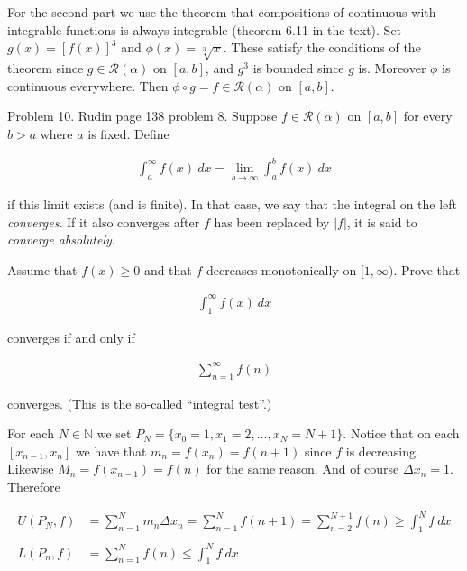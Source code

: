 \documentclass{article}
\begin{document}
  For the second part we use the theorem that compositions of continuous with integrable functions is always integrable (theorem 6.11 in the text).  Set $g(x)=[f(x)]^3$ and $\phi(x)=\sqrt[3]x$.  These satisfy the conditions of the theorem since $g\in\mathscr R(\alpha)$ on $[a,b]$, and $g^3$ is bounded since $g$ is.  Moreover $\phi$ is continuous everywhere. Then $\phi\circ g = f \in\mathscr R(\alpha)$ on $[a,b]$.

  \pagebreak
  {\Large \color{Sepia} Problem 10. Rudin page 138 problem 8. Suppose $f\in\mathscr R(\alpha)$ on $[a,b]$ for every $b>a$ where $a$ is fixed.  Define

  \begin{align*}
    \int_a^\infty f(x) \ dx = \lim_{b\to \infty}\int_a^b f(x)\ dx
  \end{align*}

  if this limit exists (and is finite).  In that case, we say that the integral on the left {\it converges}.  If it also converges after $f$ has been replaced by $|f|$, it is said to {\it converge absolutely}.

  Assume that $f(x)\geq 0$ and that $f$ decreases monotonically on $[1,\infty)$.  Prove that

  \begin{align*}
    \int_1^\infty f(x) \ dx
  \end{align*}

  converges if and only if

  \begin{align*}
    \sum_{n=1}^\infty f(n)
  \end{align*}


  converges.  (This is the so-called ``integral test''.)

  }

  \vspace{1cm}

  For each $N\in\mathbb N$ we set $P_N=\{x_0=1,x_1=2,\dots,x_N=N+1\}$.  Notice that on each $[x_{n-1},x_n]$ we have that $m_n=f(x_n)=f(n+1)$ since $f$ is decreasing.  Likewise $M_n=f(x_{n-1})=f(n)$ for the same reason.  And of course $\Delta x_n=1$.  Therefore 

  \begin{align*}
    U(P_N,f)&=\sum_{n=1}^N m_n\Delta x_n=\sum_{n=1}^N f(n+1) =\sum_{n=2}^{N+1} f(n)\geq \int_1^N f \ dx\\\\
    L(P_n,f)&=\sum_{n=1}^N f(n) \leq \int_1^N f \ dx
  \end{align*}
\end{document}
